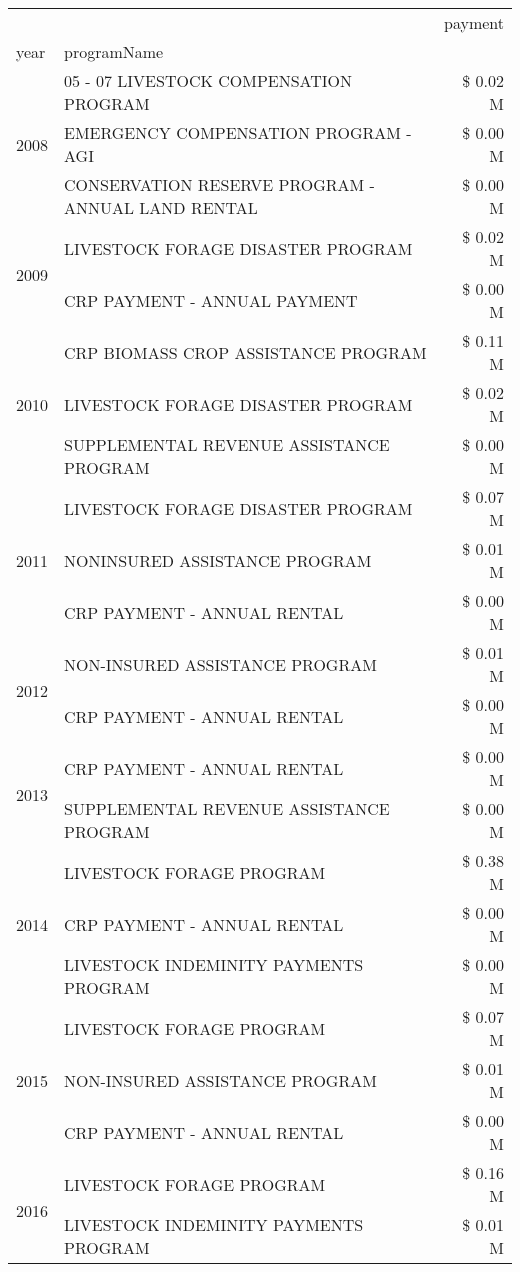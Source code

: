\begin{tabular}{llr}
\toprule
 &  & payment \\
year & programName &  \\
\midrule
\multirow[t]{3}{*}{2008} & 05 - 07 LIVESTOCK COMPENSATION PROGRAM & \$ 0.02 M \\
 & EMERGENCY COMPENSATION PROGRAM - AGI & \$ 0.00 M \\
 & CONSERVATION RESERVE PROGRAM - ANNUAL LAND RENTAL & \$ 0.00 M \\
\cline{1-3}
\multirow[t]{2}{*}{2009} & LIVESTOCK FORAGE DISASTER  PROGRAM & \$ 0.02 M \\
 & CRP PAYMENT - ANNUAL PAYMENT & \$ 0.00 M \\
\cline{1-3}
\multirow[t]{3}{*}{2010} & CRP BIOMASS CROP ASSISTANCE PROGRAM & \$ 0.11 M \\
 & LIVESTOCK FORAGE DISASTER PROGRAM & \$ 0.02 M \\
 & SUPPLEMENTAL REVENUE ASSISTANCE PROGRAM & \$ 0.00 M \\
\cline{1-3}
\multirow[t]{3}{*}{2011} & LIVESTOCK FORAGE DISASTER PROGRAM & \$ 0.07 M \\
 & NONINSURED ASSISTANCE PROGRAM & \$ 0.01 M \\
 & CRP PAYMENT - ANNUAL RENTAL & \$ 0.00 M \\
\cline{1-3}
\multirow[t]{2}{*}{2012} & NON-INSURED ASSISTANCE PROGRAM & \$ 0.01 M \\
 & CRP PAYMENT - ANNUAL RENTAL & \$ 0.00 M \\
\cline{1-3}
\multirow[t]{2}{*}{2013} & CRP PAYMENT - ANNUAL RENTAL & \$ 0.00 M \\
 & SUPPLEMENTAL REVENUE ASSISTANCE PROGRAM & \$ 0.00 M \\
\cline{1-3}
\multirow[t]{3}{*}{2014} & LIVESTOCK FORAGE PROGRAM & \$ 0.38 M \\
 & CRP PAYMENT - ANNUAL RENTAL & \$ 0.00 M \\
 & LIVESTOCK INDEMINITY PAYMENTS PROGRAM & \$ 0.00 M \\
\cline{1-3}
\multirow[t]{3}{*}{2015} & LIVESTOCK FORAGE PROGRAM & \$ 0.07 M \\
 & NON-INSURED ASSISTANCE PROGRAM & \$ 0.01 M \\
 & CRP PAYMENT - ANNUAL RENTAL & \$ 0.00 M \\
\cline{1-3}
\multirow[t]{3}{*}{2016} & LIVESTOCK FORAGE PROGRAM & \$ 0.16 M \\
 & LIVESTOCK INDEMINITY PAYMENTS PROGRAM & \$ 0.01 M \\

\end{tabular}
